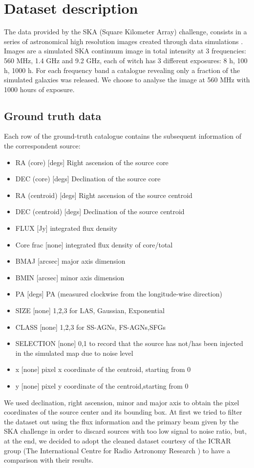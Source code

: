 \documentclass[a4paper,10pt]{report}
\begin{document}
\chapter{Dataset description}\label{chap:dataset-description}

The data provided by the SKA (Square Kilometer Array) challenge, consists in a series of astronomical high resolution images created through data simulations \cite{bonaldi2021square}.  Images are a simulated SKA continuum image in total intensity at 3 frequencies: 560 MHz, 1.4 GHz and  9.2 GHz, each of witch has 3 different exposures: 8 h, 100 h, 1000 h. For each frequency band a catalogue revealing only a fraction of the simulated galaxies was released. We choose to analyse the image at 560 MHz with 1000 hours of exposure. 

\section{Ground truth data} \label{sec:ground_truth_data}
Each row of the ground-truth catalogue contains the subsequent information of the correspondent source: 
\begin{itemize}
    \item RA (core)  [degs]    Right ascension of the source core
    \item DEC (core)    [degs]    Declination of the source core
    \item RA (centroid)    [degs]    Right ascension of the source centroid
    \item DEC (centroid)    [degs]    Declination of the source centroid
    \item FLUX    [Jy]    integrated flux density
    \item Core frac    [none]    integrated flux density of core/total
    \item  BMAJ    [arcsec]    major axis dimension
    \item  BMIN    [arcsec]    minor axis dimension
    \item  PA    [degs] PA (measured clockwise from the longitude-wise direction)
    \item    SIZE    [none]    1,2,3 for LAS, Gaussian, Exponential
    \item    CLASS    [none]    1,2,3 for SS-AGNs, FS-AGNs,SFGs
    \item  SELECTION    [none]  0,1 to record that the source has not/has been injected in the simulated map due to noise level
    \item    x    [none]    pixel x coordinate of the centroid, starting from 0
    \item   y    [none]    pixel y coordinate of the centroid,starting from 0
\end{itemize}
We used declination, right ascension, minor and major axis to obtain the pixel coordinates of the source center and its bounding box. At first we tried to filter the dataset out using the flux information and the primary beam given by the SKA challenge in order to discard sources with too low signal to noise ratio, but, at the end, we decided to adopt the cleaned dataset courtesy of the ICRAR group (The International Centre for Radio Astronomy Research ) to have a comparison with their results.
\end{document}

